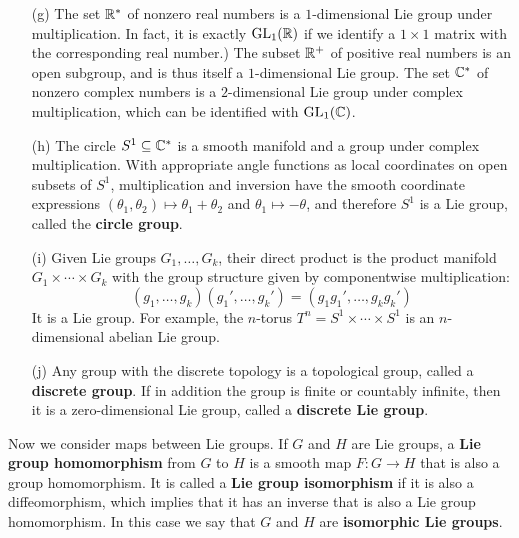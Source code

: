 \begin{example}
\begin{itemize}
\item[(g)] The set $\mathbb{R}^*$ of nonzero real numbers is a $1$-dimensional Lie group under multiplication. In fact, it is exactly $\mathrm{GL}_1(\mathbb{R})$ if we identify a $1\times 1$ matrix with the corresponding real number.) The subset $\mathbb{R}^+$ of positive real numbers is an open subgroup, and is thus itself a $1$-dimensional Lie group. The set $\mathbb{C}^*$ of nonzero complex numbers is a $2$-dimensional Lie group under complex multiplication, which can be identified with $\mathrm{GL}_1(\mathbb{C})$.
\item[(h)] The circle $S^1\subseteq\mathbb{C}^*$ is a smooth manifold and a group under complex multiplication. With appropriate angle functions as local coordinates on open subsets of $S^1$, multiplication and inversion have the smooth coordinate expressions $(\theta_1,\theta_2)\mapsto\theta_1+\theta_2$ and $\theta_1\mapsto-\theta$, and therefore $S^1$ is a Lie group, called the \textbf{circle group}.
\item[(i)] Given Lie groups $G_1,\dots,G_k$, their direct product is the product manifold
$G_1\times\cdots\times G_k$ with the group structure given by componentwise multiplication:
\[(g_1,\dots,g_k)(g_1',\dots,g_k')=(g_1g_1',\dots,g_kg_k')\]
It is a Lie group. For example, the $n$-torus $T^n=S^1\times\cdots\times S^1$ is an $n$-dimensional abelian Lie group.
\item[(j)] Any group with the discrete topology is a topological group, called a \textbf{discrete group}. If in addition the group is finite or countably infinite, then it is a zero-dimensional Lie group, called a \textbf{discrete Lie group}.
\end{itemize}
\end{example}
Now we consider maps between Lie groups. If $G$ and $H$ are Lie groups, a \textbf{Lie group homomorphism} from $G$ to $H$ is a smooth map $F:G\to H$ that is also a group homomorphism. It is called a \textbf{Lie group isomorphism} if it is also a diffeomorphism, which implies that it has an inverse that is also a Lie group homomorphism. In this case we say that $G$ and $H$ are \textbf{isomorphic Lie groups}.
